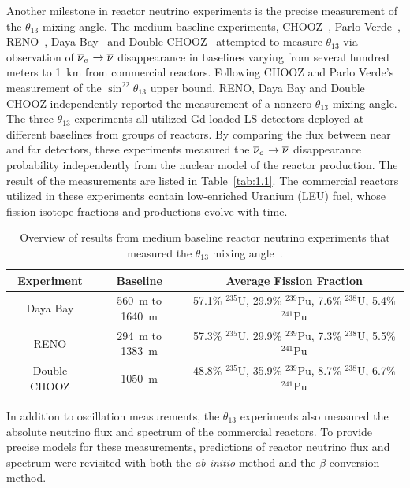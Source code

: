     Another milestone in reactor neutrino experiments is the precise measurement of the $\theta_{13}$ mixing angle. 
    The medium baseline experiments, CHOOZ~\cite{bib:chooz03}, Parlo Verde~\cite{bib:palo2000}, RENO~\cite{bib:RENO}, Daya Bay~\cite{bib:DYBosc} and Double CHOOZ~\cite{bib:DBChooz} attempted to measure $\theta_{13}$ via observation of $\overline{\nu }_{e}\hspace{1pt}\rightarrow\overline{\nu}$ disappearance in baselines varying from several hundred meters to 1~km from commercial reactors.
    Following CHOOZ and Parlo Verde's measurement of the $\sin^22\theta_{13}$ upper bound, RENO, Daya Bay and Double CHOOZ independently reported the measurement of a nonzero $\theta_{13}$ mixing angle.
    The three $\theta_{13}$ experiments all utilized Gd loaded LS detectors deployed at different baselines from groups of reactors.
    By comparing the \nuebar flux between near and far detectors, these experiments measured the $\overline{\nu }_{e}\hspace{1pt}\rightarrow\overline{\nu}$ disappearance probability independently from the nuclear model of the reactor \nuebar production.
    The result of the measurements are listed in Table~\ref{tab:1.1}.
    The commercial reactors utilized in these experiments contain low-enriched Uranium (LEU) fuel, whose fission isotope fractions and \nuebar productions evolve with time.
    \begin{table}[h]
    \centering
    \caption[$\theta_{13}$ reactor experiments]{Overview of results from medium baseline reactor neutrino experiments that measured the $\theta_{13}$ mixing angle~\cite{bib:RENO, bib:DYBosc, bib:DBChooz}.
}
    \begin{tabular}{ccc}
    \hline
    \hline
    Experiment  & Baseline   & Average Fission Fraction   \\ 
    \hline
    Daya Bay     & 560~m to 1640~m  & 57.1\% $^{235}$U, 29.9\% $^{239}$Pu, 7.6\% $^{238}$U, 5.4\% $^{241}$Pu \\
    RENO     & 294~m to 1383~m & 57.3\% $^{235}$U, 29.9\% $^{239}$Pu, 7.3\% $^{238}$U, 5.5\% $^{241}$Pu \\
    Double CHOOZ    & 1050~m & 48.8\% $^{235}$U, 35.9\% $^{239}$Pu, 8.7\% $^{238}$U, 6.7\% $^{241}$Pu \\
    \hline
    \end{tabular}
    \label{tab:theta13}
    \end{table}

\label{c2s3}
        
    In addition to oscillation measurements, the $\theta_{13}$ experiments also measured the absolute neutrino flux and spectrum of the commercial reactors. 
    To provide precise models for these measurements, predictions of reactor neutrino flux and spectrum were revisited with both the \textit{ab initio} method and the $\beta$ conversion method.
    
